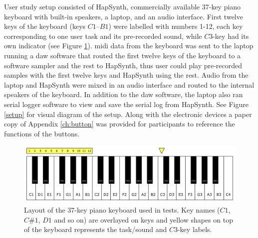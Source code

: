 User study setup consisted of HapSynth, commercially available 37-key piano keyboard with built-in speakers, a laptop, and an audio interface. First twelve keys of the keyboard (keys $C1$--$B1$) were labelled with numbers 1-12, each key corresponding to one user task and its pre-recorded sound, while $C3$-key had its own indicator (see Figure \ref{keyboard}). \gls{midi} data from the keyboard was sent to the laptop running a \gls{daw} software that routed the first twelve keys of the keyboard to a software sampler and the rest to HapSynth, thus user could play pre-recorded samples with the first twelve keys and HapSynth using the rest. Audio from the laptop and HapSynth were mixed in an audio interface and routed to the internal speakers of the keyboard. In addition to the \gls{daw} software, the laptop also ran serial logger software to view and save the serial log from HapSynth. See Figure \ref{setup} for visual diagram of the setup. Along with the electronic devices a paper copy of Appendix \ref{ch:button} was provided for participants to reference the functions of the buttons.

\begin{figure}[h]
	\centering
	\includegraphics[width=1.0\linewidth]{figures/keyboard.png}
	\caption{Layout of the 37-key piano keyboard used in tests. Key names ($C1$, $C\#1$, $D1$ and so on) are overlayed on keys and yellow shapes on top of the keyboard represents the task/sound and $C3$-key labels.}
	\label{keyboard}
\end{figure}

